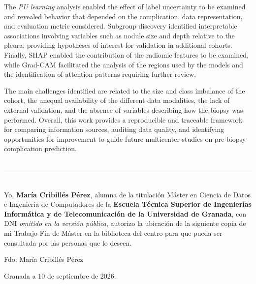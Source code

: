 The \textit{PU learning} analysis enabled the effect of label uncertainty to be examined and revealed behavior that depended on the complication, data representation, and evaluation metric considered. Subgroup discovery identified interpretable associations involving variables such as nodule size and depth relative to the pleura, providing hypotheses of interest for validation in additional cohorts. Finally, SHAP enabled the contribution of the radiomic features to be examined, while Grad-CAM facilitated the analysis of the regions used by the models and the identification of attention patterns requiring further review.

The main challenges identified are related to the size and class imbalance of the cohort, the unequal availability of the different data modalities, the lack of external validation, and the absence of variables describing how the biopsy was performed. Overall, this work provides a reproducible and traceable framework for comparing information sources, auditing data quality, and identifying opportunities for improvement to guide future multicenter studies on pre-biopsy complication prediction.

\chapter*{}
\thispagestyle{empty}

\noindent\rule[-1ex]{\textwidth}{2pt}\\[4.5ex]

Yo, \textbf{María Cribillés Pérez}, alumna de la titulación Máster en Ciencia de Datos e Ingeniería
de Computadores de la \textbf{Escuela Técnica Superior
de Ingenierías Informática y de Telecomunicación de la Universidad de Granada}, con DNI \textit{omitido en la versión pública}, autorizo la
ubicación de la siguiente copia de mi Trabajo Fin de Máster en la biblioteca del centro para que pueda ser
consultada por las personas que lo deseen.

\vspace{6cm}

\noindent Fdo: María Cribillés Pérez

\vspace{2cm}

\begin{flushright}
Granada a 10 de septiembre de 2026.
\end{flushright}


\chapter*{}
\thispagestyle{empty}

